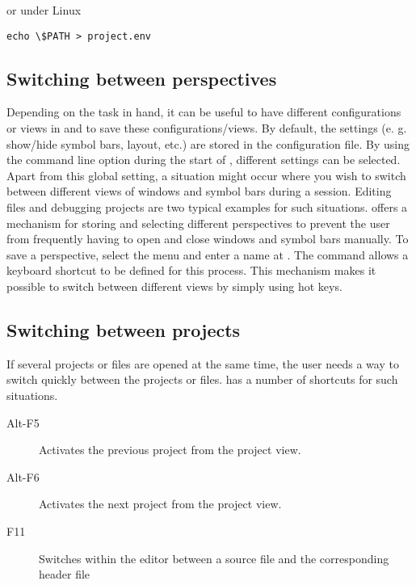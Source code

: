 or under Linux

\begin{lstlisting}
echo \$PATH > project.env
\end{lstlisting}

\subsection{Switching between perspectives}

Depending on the task in hand, it can be useful to have different configurations or views in \codeblocks and to save these configurations/views. By default, the settings (e. g. show/hide symbol bars, layout, etc.) are stored in the  configuration file. By using the command line option  during the start of \codeblocks, different settings can be selected. Apart from this global setting, a situation might occur where you wish to switch between different views of windows and symbol bars during a session. Editing files and debugging projects are two typical examples for such situations. \codeblocks offers a mechanism for storing and selecting different perspectives to prevent the user from frequently having to open and close windows and symbol bars manually. To save a perspective, select the menu  and enter a name at . The command  allows a keyboard shortcut to be defined for this process. This mechanism makes it possible to switch between different views by simply using hot keys.


\subsection{Switching between projects}

If several projects or files are opened at the same time, the user needs a way to switch quickly between the projects or files. \codeblocks has a number of shortcuts for such situations.

\begin{description}
\item[Alt-F5] Activates the previous project from the project view.
\item[Alt-F6] Activates the next project from the project view.
\item[F11] Switches within the editor between a source file  and the corresponding header file 
\end{description}

